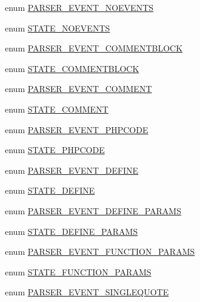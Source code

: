 \begin{DoxyCompactItemize}
enum \hyperlink{_parser_8inc_a52330179a1e2419bc88054046b89b0ec}{\-P\-A\-R\-S\-E\-R\-\_\-\-E\-V\-E\-N\-T\-\_\-\-N\-O\-E\-V\-E\-N\-T\-S} 
\item 
enum \hyperlink{_parser_8inc_a20faaaef87097b7911d85bbb7b13a00d}{\-S\-T\-A\-T\-E\-\_\-\-N\-O\-E\-V\-E\-N\-T\-S} 
\item 
enum \hyperlink{_parser_8inc_a7ef16c27bac9a5751547632501cff278}{\-P\-A\-R\-S\-E\-R\-\_\-\-E\-V\-E\-N\-T\-\_\-\-C\-O\-M\-M\-E\-N\-T\-B\-L\-O\-C\-K} 
\item 
enum \hyperlink{_parser_8inc_a826c4b63e70b32d63c5cae29753a3fae}{\-S\-T\-A\-T\-E\-\_\-\-C\-O\-M\-M\-E\-N\-T\-B\-L\-O\-C\-K} 
\item 
enum \hyperlink{_parser_8inc_af5a79123f9d894f65cb9b2232c8944c1}{\-P\-A\-R\-S\-E\-R\-\_\-\-E\-V\-E\-N\-T\-\_\-\-C\-O\-M\-M\-E\-N\-T} 
\item 
enum \hyperlink{_parser_8inc_a2785dd6343120125c702582dccf41883}{\-S\-T\-A\-T\-E\-\_\-\-C\-O\-M\-M\-E\-N\-T} 
\item 
enum \hyperlink{_parser_8inc_a120661dfb04934ff4fb7e78e822555c1}{\-P\-A\-R\-S\-E\-R\-\_\-\-E\-V\-E\-N\-T\-\_\-\-P\-H\-P\-C\-O\-D\-E} 
\item 
enum \hyperlink{_parser_8inc_ad062c44ff7032397289661f50ca51475}{\-S\-T\-A\-T\-E\-\_\-\-P\-H\-P\-C\-O\-D\-E} 
\item 
enum \hyperlink{_parser_8inc_a934a19ee43b7f712f3798f742a087d44}{\-P\-A\-R\-S\-E\-R\-\_\-\-E\-V\-E\-N\-T\-\_\-\-D\-E\-F\-I\-N\-E} 
\item 
enum \hyperlink{_parser_8inc_aed6f9d20d6e1bd5baad989431a379dc9}{\-S\-T\-A\-T\-E\-\_\-\-D\-E\-F\-I\-N\-E} 
\item 
enum \hyperlink{_parser_8inc_ae953db49c1d4f8fb744b15184ffdb14d}{\-P\-A\-R\-S\-E\-R\-\_\-\-E\-V\-E\-N\-T\-\_\-\-D\-E\-F\-I\-N\-E\-\_\-\-P\-A\-R\-A\-M\-S} 
\item 
enum \hyperlink{_parser_8inc_ad6aff5094c332c59be1cc505d2fb87d9}{\-S\-T\-A\-T\-E\-\_\-\-D\-E\-F\-I\-N\-E\-\_\-\-P\-A\-R\-A\-M\-S} 
\item 
enum \hyperlink{_parser_8inc_a9af56a9709cec1677b1c4e37f9a1e6b3}{\-P\-A\-R\-S\-E\-R\-\_\-\-E\-V\-E\-N\-T\-\_\-\-F\-U\-N\-C\-T\-I\-O\-N\-\_\-\-P\-A\-R\-A\-M\-S} 
\item 
enum \hyperlink{_parser_8inc_ae55f7caa8ab69a45dd52222f47d465f3}{\-S\-T\-A\-T\-E\-\_\-\-F\-U\-N\-C\-T\-I\-O\-N\-\_\-\-P\-A\-R\-A\-M\-S} 
\item 
enum \hyperlink{_parser_8inc_a600090b20e4c80c2a5b96117f091191c}{\-P\-A\-R\-S\-E\-R\-\_\-\-E\-V\-E\-N\-T\-\_\-\-S\-I\-N\-G\-L\-E\-Q\-U\-O\-T\-E} 

\end{DoxyCompactItemize}

